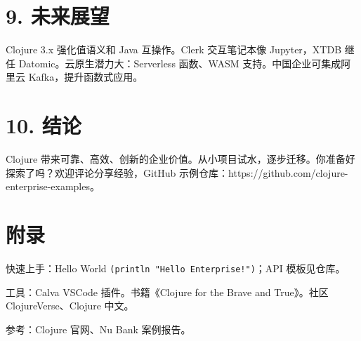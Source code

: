 \chapter{9. 未来展望}
Clojure 3.x 强化值语义和 Java 互操作。Clerk 交互笔记本像 Jupyter，XTDB 继任 Datomic。云原生潜力大：Serverless 函数、WASM 支持。中国企业可集成阿里云 Kafka，提升函数式应用。\par
\chapter{10. 结论}
Clojure 带来可靠、高效、创新的企业价值。从小项目试水，逐步迁移。你准备好探索了吗？欢迎评论分享经验，GitHub 示例仓库：https://github.com/clojure-enterprise-examples。\par
\chapter{附录}
快速上手：Hello World \texttt{(println "Hello Enterprise!")}；API 模板见仓库。\par
工具：Calva VSCode 插件。书籍《Clojure for the Brave and True》。社区 ClojureVerse、Clojure 中文。\par
参考：Clojure 官网、Nu Bank 案例报告。\par
